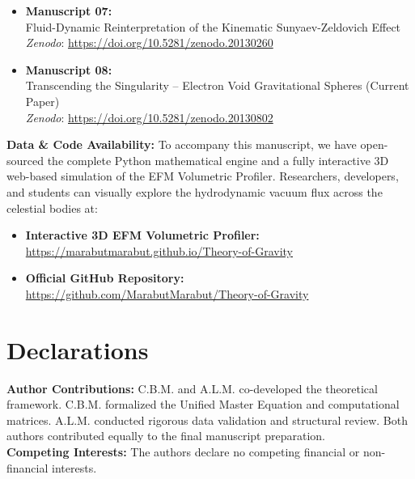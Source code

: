 \documentclass[11pt, a4paper]{article}
\begin{document}
\begin{itemize}
    \item \textbf{Manuscript 07:} \\ Fluid-Dynamic Reinterpretation of the Kinematic Sunyaev-Zeldovich Effect \\ \textit{Zenodo}: \url{https://doi.org/10.5281/zenodo.20130260}

    \item \textbf{Manuscript 08:} \\ Transcending the Singularity -- Electron Void Gravitational Spheres (Current Paper) \\ \textit{Zenodo}: \url{https://doi.org/10.5281/zenodo.20130802}
  \end{itemize}

  \vspace{1em}
  \noindent \textbf{Data \& Code Availability:} To accompany this manuscript, we have open-sourced the complete Python mathematical engine and a fully interactive 3D web-based simulation of the EFM Volumetric Profiler. Researchers, developers, and students can visually explore the hydrodynamic vacuum flux across the celestial bodies at: 
  \begin{itemize}
    \item \textbf{Interactive 3D EFM Volumetric Profiler:} \\ \url{https://marabutmarabut.github.io/Theory-of-Gravity}
    
    \item \textbf{Official GitHub Repository:} \\ \url{https://github.com/MarabutMarabut/Theory-of-Gravity}
  \end{itemize}

\clearpage
\section*{Declarations}
\textbf{Author Contributions:} C.B.M. and A.L.M. co-developed the theoretical framework. C.B.M. formalized the Unified Master Equation and computational matrices. A.L.M. conducted rigorous data validation and structural review. Both authors contributed equally to the final manuscript preparation. \\[0.5em]
\textbf{Competing Interests:} The authors declare no competing financial or non-financial interests.

\end{document}
